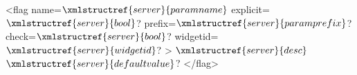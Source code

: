 <flag name=$\xmlstructref{server}{paramname}$ explicit=$\xmlstructref{server}{bool}$? prefix=$\xmlstructref{server}{paramprefix}$? check=$\xmlstructref{server}{bool}$? 
     widgetid=$\xmlstructref{server}{widgetid}$? >
  $\xmlstructref{server}{desc}$
  $\xmlstructref{server}{defaultvalue}$?
</flag>
